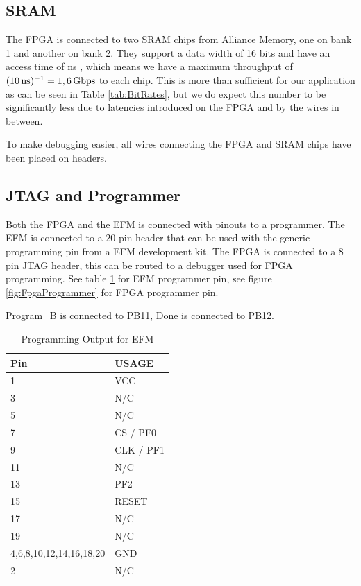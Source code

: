 \subsection{SRAM}
\label{subsec:sram}
The FPGA is connected to two SRAM chips from Alliance Memory, one on bank 1 and another on bank 2.
They support a data width of 16 bits and have an access time of \unit[10]{ns} \cite{sramdatasheet}, which means we have a maximum throughput of $(\unit[10]{ns})^{-1} = \unit[1,6]{Gbps}$ to each chip.
This is more than sufficient for our application as can be seen in Table \ref{tab:BitRates}, but we do expect this number to be significantly less due to latencies introduced on the FPGA and by the wires in between.

To make debugging easier, all wires connecting the FPGA and SRAM chips have been placed on headers.

\subsection{JTAG and Programmer}
Both the FPGA and the EFM is connected with pinouts to a programmer. The EFM is connected to a 20 pin header that can be used with the generic programming pin from a EFM development kit. 
The FPGA is connected to a 8 pin JTAG header, this can be routed to a debugger used for FPGA programming.  See table \ref{tab:EfmProgrammer} for EFM programmer pin, see figure \ref{fig:FpgaProgrammer} for FPGA programmer pin.

Program\_B is connected to PB11, Done is connected to PB12.
\begin{table}[]
    \centering
    \begin{tabular}{ll}
        Pin                     & USAGE     \\
        \hline
        1                       & VCC       \\
        3                       & N/C       \\
        5                       & N/C       \\
        7                       & CS / PF0  \\
        9                       & CLK / PF1 \\
        11                      & N/C       \\
        13                      & PF2       \\
        15                      & RESET     \\
        17                      & N/C       \\
        19                      & N/C       \\
        4,6,8,10,12,14,16,18,20 & GND       \\
        2                       & N/C
    \end{tabular}
    \caption{Programming Output for EFM}
    \label{tab:EfmProgrammer}
\end{table}

